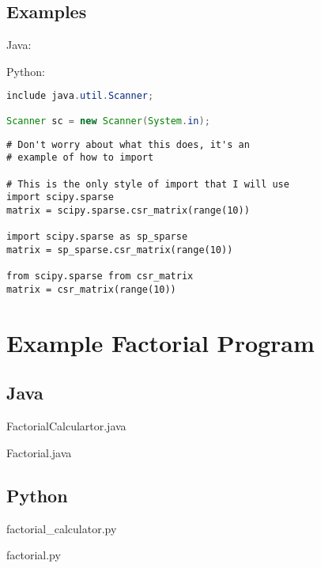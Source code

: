 \documentclass{article}
\begin{document}
\subsection{Examples}
\begin{minipage}{0.45\linewidth}
    Java:
\end{minipage}
\hfill
\begin{minipage}{0.45\linewidth}
    Python:
\end{minipage}

\begin{minipage}{0.45\linewidth}
    \begin{lstlisting}[language=Java]
include java.util.Scanner;

Scanner sc = new Scanner(System.in);
    \end{lstlisting}
\end{minipage}
\hfill
\begin{minipage}{0.45\linewidth}
    \begin{lstlisting}
# Don't worry about what this does, it's an
# example of how to import

# This is the only style of import that I will use
import scipy.sparse
matrix = scipy.sparse.csr_matrix(range(10))

import scipy.sparse as sp_sparse
matrix = sp_sparse.csr_matrix(range(10))

from scipy.sparse from csr_matrix
matrix = csr_matrix(range(10))
    \end{lstlisting}
\end{minipage}

\newpage

\section{Example Factorial Program}
\subsection{Java}
FactorialCalculartor.java

Factorial.java


\subsection{Python}
factorial\_calculator.py

factorial.py

\end{document}
